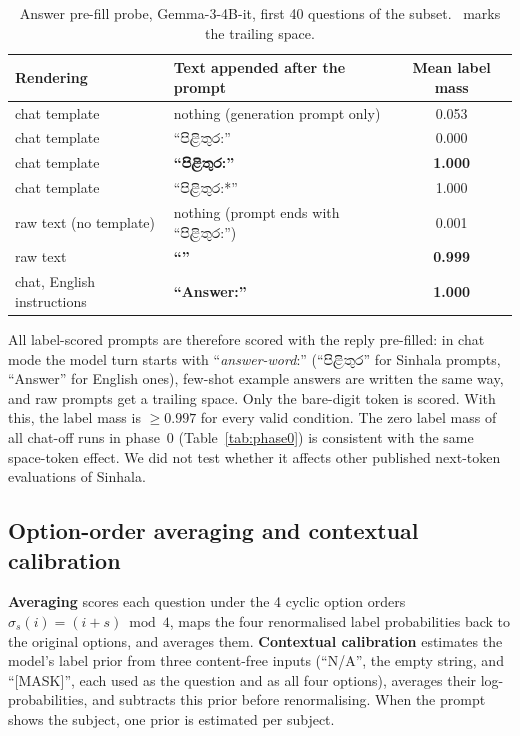 \documentclass[10pt,a4paper]{article}
\newcommand{\si}[1]{{\sinhalafont #1}}
\begin{document}
\begin{table}[h]
\centering\small
\begin{tabular}{llc}
\toprule
Rendering & Text appended after the prompt & Mean label mass\\
\midrule
chat template & nothing (generation prompt only) & 0.053\\
chat template & ``\si{පිළිතුර}:'' & 0.000\\
chat template & \textbf{``\si{පිළිතුර}:\textvisiblespace''} & \textbf{1.000}\\
chat template & ``\si{පිළිතුර}:\textvisiblespace**'' & 1.000\\
raw text (no template) & nothing (prompt ends with ``\si{පිළිතුර}:'') & 0.001\\
raw text & \textbf{``\textvisiblespace''} & \textbf{0.999}\\
chat, English instructions & \textbf{``Answer:\textvisiblespace''} & \textbf{1.000}\\
\bottomrule
\end{tabular}
\caption{Answer pre-fill probe, Gemma-3-4B-it, first 40 questions of the subset. \textvisiblespace\ marks the trailing
space.}
\label{tab:prefill}
\end{table}

All label-scored prompts are therefore scored with the reply pre-filled: in chat mode the model turn starts with
``\textit{answer-word}:\textvisiblespace'' (``\si{පිළිතුර}'' for Sinhala prompts, ``Answer'' for English ones), few-shot
example answers are written the same way, and raw prompts get a trailing space. Only the bare-digit token is scored.
With this, the label mass is $\ge 0.997$ for every valid condition. The zero label mass of all chat-off runs in
phase~0 (Table~\ref{tab:phase0}) is consistent with the same space-token effect. We did not test whether it affects
other published next-token evaluations of Sinhala.

\subsection{Option-order averaging and contextual calibration}
\textbf{Averaging} scores each question under the 4 cyclic option orders $\sigma_s(i) = (i+s) \bmod 4$, maps the four
renormalised label probabilities back to the original options, and averages them. \textbf{Contextual calibration}
\cite{zhao2021} estimates the model's label prior from three content-free inputs (``N/A'', the empty string, and
``[MASK]'', each used as the question and as all four options), averages their log-probabilities, and subtracts this
prior before renormalising. When the prompt shows the subject, one prior is estimated per subject.
\end{document}
